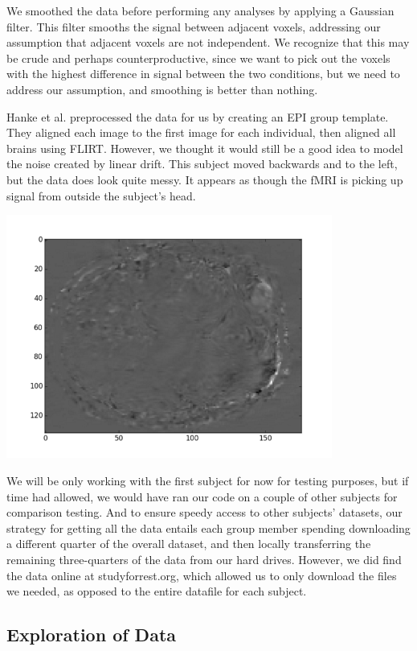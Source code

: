 \documentclass[11pt]{article}
\begin{document}
We smoothed the data before performing any analyses by applying a Gaussian
filter.  This filter smooths the signal between adjacent voxels, addressing
our assumption that adjacent voxels are not independent.  We recognize that
this may be crude and perhaps counterproductive, since we want to pick out the
voxels with the highest difference in signal between the two conditions, but
we need to address our assumption, and smoothing is better than nothing.

Hanke et al. preprocessed the data for us by creating an EPI group template.
They aligned each image to the first image for each individual, then aligned
all brains using FLIRT.  However, we thought it would still be a good idea to
model the noise created by linear drift.  This subject moved backwards and to
the left, but the data does look quite messy.  It appears as though the fMRI
is picking up signal from outside the subject’s head.

\begin{center}
\includegraphics[height=8cm]{1}
\end{center}

We will be only working with the first subject for now for testing purposes,
but if time had allowed, we would have ran our code on a couple of other
subjects for comparison testing. And to ensure speedy access to other
subjects' datasets, our strategy for getting all the data entails each group
member spending downloading a different quarter of the overall dataset, and
then locally transferring the remaining three-quarters of the data from our
hard drives.  However, we did find the data online at studyforrest.org, which
allowed us to only download the files we needed, as opposed to the entire
datafile for each subject.

\subsection{Exploration of Data}
\end{document}
